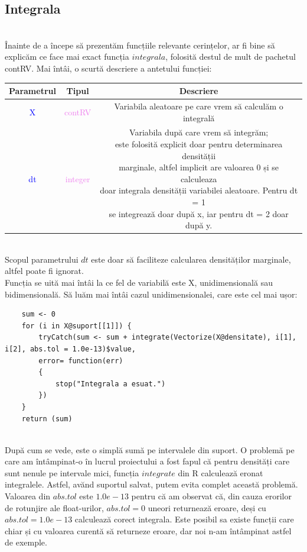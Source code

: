 \documentclass[12pt]{article}
\begin{document}
\subsection{Integrala}\hfill \\
\indent Înainte de a începe să prezentăm funcțiile relevante cerințelor, ar fi bine să explicăm ce face mai exact funcția $integrala$, folosită destul de mult de pachetul contRV. Mai întâi, o scurtă descriere a antetului funcției:
\begin{center}
	\begin{tabular}{|| c | c | c ||}
		\hline
		Parametrul & Tipul & Descriere \\
		\hline
		\textcolor{blue}{X} & \textcolor{violet}{contRV} & Variabila aleatoare pe care vrem să calculăm o integrală\\
		\hline
		\textcolor{blue}{dt} & \textcolor{violet}{integer} & \makecell{Variabila după care vrem să integrăm; \\este folosită explicit doar pentru determinarea densității\\ marginale, altfel implicit are valoarea 0 și se calculeaza\\ doar integrala densității variabilei aleatoare. Pentru dt = 1\\ se integrează doar după x, iar pentru dt = 2 doar după y.} \\
		\hline
	\end{tabular}
\end{center}\hfill \\
\indent Scopul parametrului $dt$ este doar să faciliteze calcularea densităților marginale, altfel poate fi ignorat.\\
\indent Funcția se uită mai întâi la ce fel de variabilă este X, unidimensională sau bidimensională. Să luăm mai întâi cazul unidimensionalei, care este cel mai ușor:
\begin{lstlisting}
	sum <- 0
	for (i in X@suport[[1]]) {
		tryCatch(sum <- sum + integrate(Vectorize(X@densitate), i[1], i[2], abs.tol = 1.0e-13)$value,
		error= function(err)
		{
			stop("Integrala a esuat.")
		})
	}
	return (sum)
\end{lstlisting}\hfill \\
\indent După cum se vede, este o simplă sumă pe intervalele din suport. O problemă pe care am întâmpinat-o în lucrul proiectului a fost fapul că pentru densități care sunt nenule pe intervale mici, funcția $integrate$ din R calculează eronat integralele. Astfel, avănd suportul salvat, putem evita complet această problemă. Valoarea din $abs.tol$ este $1.0e-13$ pentru că am observat că, din cauza erorilor de rotunjire ale float-urilor, $abs.tol = 0$ uneori returnează eroare, deși cu $abs.tol = 1.0e-13$ calculează corect integrala. Este posibil sa existe funcții care chiar și cu valoarea curentă să returneze eroare, dar noi n-am întâmpinat astfel de exemple.\\
\end{document}
